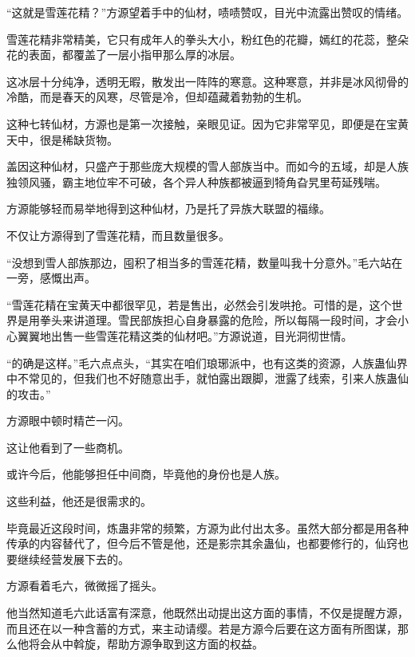 
\begin{this_body}



“这就是雪莲花精？”方源望着手中的仙材，啧啧赞叹，目光中流露出赞叹的情绪。

雪莲花精非常精美，它只有成年人的拳头大小，粉红色的花瓣，嫣红的花蕊，整朵花的表面，都覆盖了一层小指甲那么厚的冰层。

这冰层十分纯净，透明无暇，散发出一阵阵的寒意。这种寒意，并非是冰风彻骨的冷酷，而是春天的风寒，尽管是冷，但却蕴藏着勃勃的生机。

这种七转仙材，方源也是第一次接触，亲眼见证。因为它非常罕见，即便是在宝黄天中，很是稀缺货物。

盖因这种仙材，只盛产于那些庞大规模的雪人部族当中。而如今的五域，却是人族独领风骚，霸主地位牢不可破，各个异人种族都被逼到犄角旮旯里苟延残喘。

方源能够轻而易举地得到这种仙材，乃是托了异族大联盟的福缘。

不仅让方源得到了雪莲花精，而且数量很多。

“没想到雪人部族那边，囤积了相当多的雪莲花精，数量叫我十分意外。”毛六站在一旁，感慨出声。

“雪莲花精在宝黄天中都很罕见，若是售出，必然会引发哄抢。可惜的是，这个世界是用拳头来讲道理。雪民部族担心自身暴露的危险，所以每隔一段时间，才会小心翼翼地出售一些雪莲花精这类的仙材吧。”方源说道，目光洞彻世情。

“的确是这样。”毛六点点头，“其实在咱们琅琊派中，也有这类的资源，人族蛊仙界中不常见的，但我们也不好随意出手，就怕露出跟脚，泄露了线索，引来人族蛊仙的攻击。”

方源眼中顿时精芒一闪。

这让他看到了一些商机。

或许今后，他能够担任中间商，毕竟他的身份也是人族。

这些利益，他还是很需求的。

毕竟最近这段时间，炼蛊非常的频繁，方源为此付出太多。虽然大部分都是用各种传承的内容替代了，但今后不管是他，还是影宗其余蛊仙，也都要修行的，仙窍也要继续经营发展下去的。

方源看着毛六，微微摇了摇头。

他当然知道毛六此话富有深意，他既然出动提出这方面的事情，不仅是提醒方源，而且还在以一种含蓄的方式，来主动请缨。若是方源今后要在这方面有所图谋，那么他将会从中斡旋，帮助方源争取到这方面的权益。


\end{this_body}
